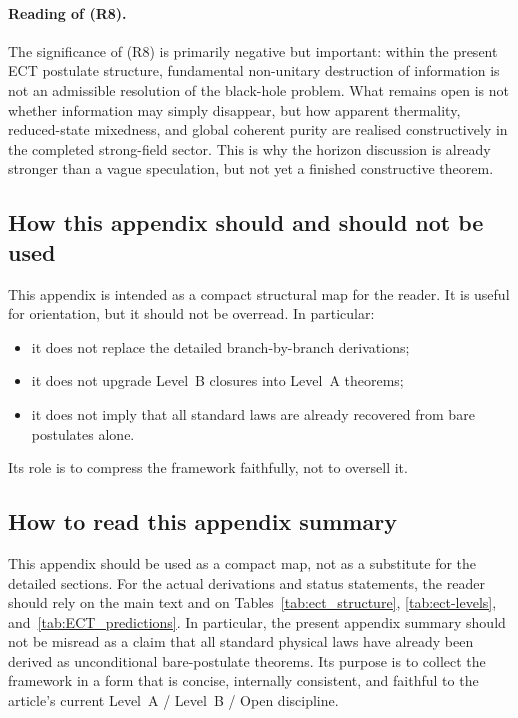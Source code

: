 \documentclass[11pt,a4paper]{article}
\numberwithin{equation}{section}
\begin{document}
\begin{description}[leftmargin=1.2em, labelindent=0pt, style=unboxed]
\paragraph{Reading of (R8).}
The significance of (R8) is primarily negative but important:
within the present ECT postulate structure, fundamental non-unitary
destruction of information is not an admissible resolution of the
black-hole problem.
What remains open is not whether information may simply disappear, but
how apparent thermality, reduced-state mixedness, and global coherent
purity are realised constructively in the completed strong-field sector.
This is why the horizon discussion is already stronger than a vague
speculation, but not yet a finished constructive theorem.

\end{description}

\subsection*{How this appendix should and should not be used}

This appendix is intended as a compact structural map for the reader.
It is useful for orientation, but it should not be overread.
In particular:
\begin{itemize}
  \item it does not replace the detailed branch-by-branch derivations;
  \item it does not upgrade Level~B closures into Level~A theorems;
  \item it does not imply that all standard laws are already recovered
  from bare postulates alone.
\end{itemize}
Its role is to compress the framework faithfully, not to oversell it.

\subsection{How to read this appendix summary}

This appendix should be used as a compact map, not as a substitute for
the detailed sections.
For the actual derivations and status statements, the reader should rely
on the main text and on Tables~\ref{tab:ect_structure},
\ref{tab:ect-levels}, and~\ref{tab:ECT_predictions}.
In particular, the present appendix summary should not be misread as a
claim that all standard physical laws have already been derived as
unconditional bare-postulate theorems.
Its purpose is to collect the framework in a form that is concise,
internally consistent, and faithful to the article's current
Level~A / Level~B / Open discipline.
\end{document}
